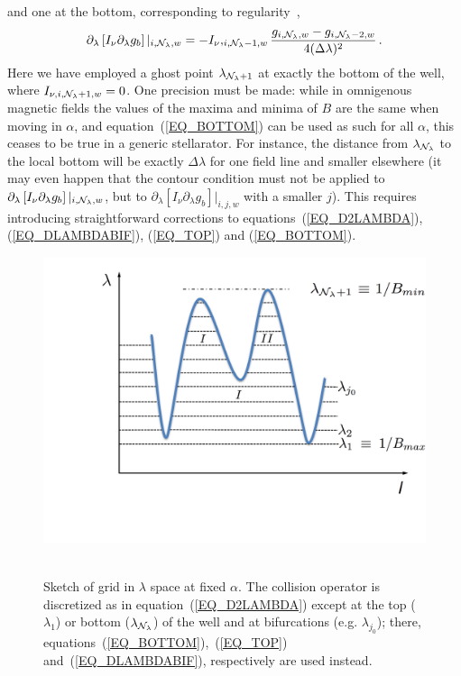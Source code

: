 and one at the bottom, corresponding to regularity~\citep{calvo2013er},
\begin{equation}
\partial_\lambda\left[ I_\nu \partial_\lambda g_b\right]|_{i,{\cal{N}}_\lambda,w} = -I_\nu,_{i,{\cal{N}_\lambda}-1,w}\frac{g_{i,{\cal{N}}_\lambda,w}-g_{i,{\cal{N}}_\lambda-2,w}}{4(\Delta\lambda)^2}\,.
\label{EQ_BOTTOM}
\end{equation}
Here we have employed a ghost point $\lambda_{{\cal{N}}_\lambda+1}$ at exactly the bottom of the well, where $I_{\nu,i,{\cal{N}}_\lambda+1,w}=0$. One precision must be made: while in omnigenous magnetic fields the values of the maxima and minima of $B$ are the same when moving in $\alpha$, and equation~(\ref{EQ_BOTTOM}) can be used as such for all $\alpha$, this ceases to be true in a generic stellarator. For instance, the distance from $\lambda_{{\cal{N}_\lambda}}$ to the local bottom will be exactly $\Delta\lambda$ for one field line and smaller elsewhere (it may even happen that the contour condition must not be applied to $\partial_\lambda\left[ I_\nu \partial_\lambda g_b\right]|_{i,{\cal{N}}_\lambda,w}$, but to $\partial_\lambda\left[ I_\nu \partial_\lambda g_b\right]|_{i,j,w}$ with a smaller $j$). This requires introducing straightforward corrections to equations~(\ref{EQ_D2LAMBDA}), (\ref{EQ_DLAMBDABIF}), (\ref{EQ_TOP}) and (\ref{EQ_BOTTOM}).

\begin{figure}
\centering
\includegraphics[angle=0,width=0.8\columnwidth]{figures/lambda_l}\
\caption{Sketch of grid in $\lambda$ space at fixed $\alpha$. The collision operator is discretized as in equation~(\ref{EQ_D2LAMBDA}) except at the top ($\lambda_1$) or bottom ($\lambda_{{\cal{N}}_\lambda}$) of the well and at bifurcations (e.g. $\lambda_{j_0}$); there, equations~(\ref{EQ_BOTTOM}),~(\ref{EQ_TOP})  and~(\ref{EQ_DLAMBDABIF}), respectively are used instead.}
\label{FIG_LAMBDA}
\end{figure}

